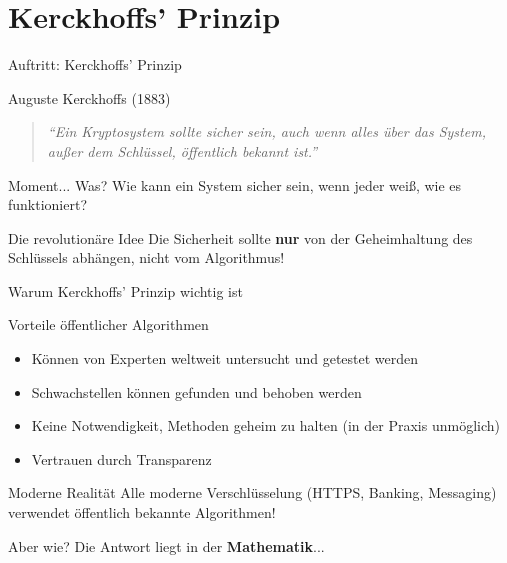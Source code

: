 \documentclass[handout]{beamer}
\begin{document}
\section{Kerckhoffs' Prinzip}

\begin{frame}{Auftritt: Kerckhoffs' Prinzip}
\begin{block}{Auguste Kerckhoffs (1883)}
\begin{quote}
\textit{``Ein Kryptosystem sollte sicher sein, auch wenn alles über das System, außer dem Schlüssel, öffentlich bekannt ist.''}
\end{quote}
\end{block}

\pause

\begin{alertblock}{Moment... Was?}
Wie kann ein System sicher sein, wenn jeder weiß, wie es funktioniert?
\end{alertblock}

\pause

\begin{block}{Die revolutionäre Idee}
Die Sicherheit sollte \textbf{nur} von der Geheimhaltung des Schlüssels abhängen, nicht vom Algorithmus!
\end{block}
\end{frame}

\begin{frame}{Warum Kerckhoffs' Prinzip wichtig ist}
\begin{block}{Vorteile öffentlicher Algorithmen}
\begin{itemize}
    \item Können von Experten weltweit untersucht und getestet werden
    \item Schwachstellen können gefunden und behoben werden
    \item Keine Notwendigkeit, Methoden geheim zu halten (in der Praxis unmöglich)
    \item Vertrauen durch Transparenz
\end{itemize}
\end{block}

\pause

\begin{exampleblock}{Moderne Realität}
Alle moderne Verschlüsselung (HTTPS, Banking, Messaging) verwendet öffentlich bekannte Algorithmen!
\end{exampleblock}

\pause

\begin{alertblock}{Aber wie?}
Die Antwort liegt in der \textbf{Mathematik}...
\end{alertblock}
\end{frame}
\end{document}
